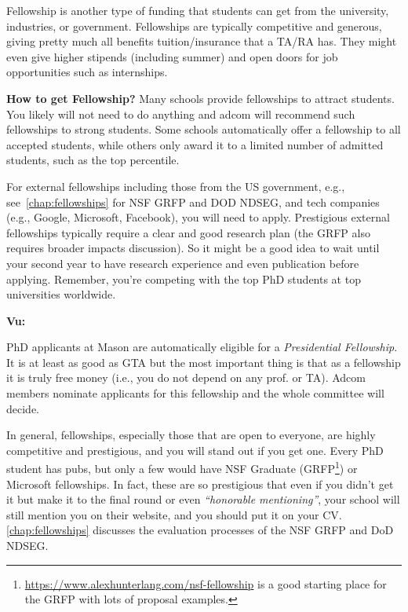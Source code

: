 \documentclass[oneside,11pt,dvipsnames]{book}
\newenvironment{commentbox}[1][]{
  \small
  \begin{mybox}
    {\small \textbf{#1}}
  }{
  \end{mybox}
}
\begin{document}
Fellowship is another type of funding that students can get from the university, industries, or government.
Fellowships are typically competitive and generous, giving pretty much all benefits tuition/insurance that a TA/RA has.  They might even give higher stipends (including summer) and open doors for job opportunities such as internships.

\textbf{How to get Fellowship?}   Many schools provide fellowships to attract students. You likely will not need to do anything and adcom will recommend such fellowships to strong students. Some schools automatically offer a fellowship to all accepted students, while others only award it to a limited number of admitted students, such as the top percentile.

For external fellowships including those from the US government, e.g., see~\autoref{chap:fellowships} for NSF GRFP and  DOD NDSEG, and tech companies (e.g., Google, Microsoft, Facebook), you will need to apply.  %
Prestigious external fellowships typically require a clear and good research plan (the GRFP also requires broader impacts discussion). So it might be a good idea to wait until your second year to have research experience and even publication before applying. Remember, you're competing with the top PhD students at top universities worldwide.

\begin{commentbox}[Vu:]
  PhD applicants at Mason are automatically eligible for a \emph{Presidential Fellowship}.  It is at least as good as GTA but the most important thing is that as a fellowship it is truly free money (i.e., you do not depend on any prof. or TA).  Adcom members nominate applicants for this fellowship and the whole committee will decide.
\end{commentbox}


In general, fellowships, especially those that are open to everyone, are highly competitive and prestigious, and you will stand out if you get one.  Every PhD student has pubs, but only a few would have NSF Graduate (GRFP\footnote{\url{https://www.alexhunterlang.com/nsf-fellowship} is a good starting place for the GRFP with lots of proposal examples.}) or Microsoft fellowships. In fact, these are so prestigious that even if you didn't get it but make it to the final round or even \emph{``honorable mentioning''}, your school will still mention you on their website, and you should put it on your CV. \autoref{chap:fellowships} discusses the evaluation processes of the NSF GRFP and DoD NDSEG.
\end{document}
